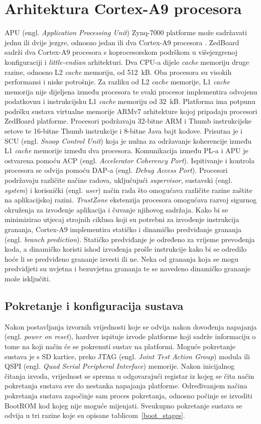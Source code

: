 \documentclass[times, utf8, diplomski, numeric]{fer}
\begin{document}
\chapter{Arhitektura Cortex-A9 procesora}
APU (engl. \textit{Application Processing Unit}) Zynq-7000 platforme može sadržavati jednu ili dvije jezgre, odnosno jedan
ili dva Cortex-A9 procesora \cite{zynq_trm}. ZedBoard sadrži dva Cortex-A9 procesora s koprocesorskom podrškom u višejezgrenoj
konfiguraciji i \textit{little-endian} arhitekturi. Dva CPU-a dijele \textit{cache} memoriju druge razine,
odnosno L2 \textit{cache} memoriju, od 512~kB.
Oba procesora su visokih performansi i niske potrošnje. Za razliku od L2 \textit{cache} memorije, L1 \textit{cache}
memorija nije dijeljena između procesora te svaki procesor implementira odvojenu podatkovnu i instrukcijsku
L1 \textit{cache} memoriju od 32~kB. Platforma ima potpunu podršku sustava virtualne memorije ARMv7 arhitekture kojoj
pripadaju procesori ZedBoard platforme. Procesori podržavaju 32-bitne ARM i Thumb instrukcijske setove te 16-bitne
Thumb instrukcije i 8-bitne Java bajt kodove. Prisutna je i SCU (engl. \textit{Snoop Control Unit}) koja je nužna za održavanje
koherencije između L1 \textit{cache} memorije između dva procesora. Komunikacija između PL-a i APU je ostvarena
pomoću ACP (engl. \textit{Accelerator Coherency Port}). Ispitivanje i kontrola procesora se odvija pomoću DAP-a
(engl. \textit{Debug Access Port}). Procesori podržavaju različite načine radova, uključujući \textit{supervisor},
sustavski (engl. \textit{system}) i korisnički (engl. \textit{user}) način rada što omogućava različite razine
zaštite na aplikacijskoj razini. \textit{TrustZone} ekstenzija procesora omogućava razvoj sigurnog okruženja za
izvođenje aplikacija i čuvanje njihovog sadržaja. Kako bi se minimizirao utjecaj strojnih ciklusa koji su potrebni
za izvođenje instrukcija grananja, Cortex-A9 implementira statičko i dinamičko predviđanje grananja (engl.
\textit{branch prediction}). Statičko predviđanje je određeno za vrijeme prevođenja koda, a dinamičko koristi
ishod izvođenja prošle instrukcije kako bi se odredilo hoće li se predviđeno grananje izvesti ili ne. Neka od
grananja koja se mogu predvidjeti su uvjetna i bezuvjetna grananja te se navedeno dinamičko grananje može isključiti.

\section{Pokretanje i konfiguracija sustava}
Nakon postavljanja izvornih vrijednosti koje se odvija nakon dovođenja napajanja (engl. \textit{power
on reset}), hardver ispituje izvode platforme koji sadrže informaciju o tome na koji način će se pokrenuti sustav na
platformi. Moguće pokretanje sustava je s SD kartice, preko JTAG (engl. \textit{Joint Test Action Group}) modula
ili QSPI (engl. \textit{Quad Serial Peripheral Interface}) memorije. Nakon inicijalnog
čitanja izvoda, vrijednost se sprema u odgovarajući registar iz kojeg se čita način pokretanja sustava sve do
nestanka napajanja platforme. Određivanjem načina pokretanja sustava započinje sam proces pokretanja, odnosno
počinje se izvoditi BootROM kod kojeg nije moguće mijenjati. Sveukupno pokretanje sustava se odvija u tri razine
koje su opisane tablicom~\ref{boot_stages}.
\end{document}
